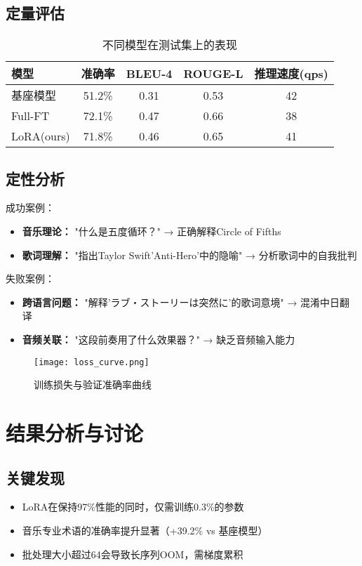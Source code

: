 \documentclass[a4paper,11pt]{article}
\begin{document}
\subsection{定量评估}
\begin{table}[h]
    \centering
    \caption{不同模型在测试集上的表现}
    \begin{tabular}{lcccc}
        \toprule
        模型 & 准确率 & BLEU-4 & ROUGE-L & 推理速度(qps) \\
        \midrule
        基座模型 & 51.2\% & 0.31 & 0.53 & 42 \\
        Full-FT & 72.1\% & 0.47 & 0.66 & 38 \\
        LoRA(ours) & 71.8\% & 0.46 & 0.65 & 41 \\
        \bottomrule
    \end{tabular}
\end{table}

\subsection{定性分析}
成功案例：
\begin{itemize}
    \item \textbf{音乐理论：} "什么是五度循环？" → 正确解释Circle of Fifths
    \item \textbf{歌词理解：} "指出Taylor Swift'Anti-Hero'中的隐喻" → 分析歌词中的自我批判
\end{itemize}

失败案例：
\begin{itemize}
    \item \textbf{跨语言问题：} "解释'ラブ・ストーリーは突然に'的歌词意境" → 混淆中日翻译
    \item \textbf{音频关联：} "这段前奏用了什么效果器？" → 缺乏音频输入能力
\end{itemize}

\begin{figure}[h]
    \centering
    \texttt{[image: loss\_curve.png]}
    \caption{训练损失与验证准确率曲线}
    \label{fig:training}
\end{figure}

\section{结果分析与讨论}
\subsection{关键发现}
\begin{itemize}
    \item LoRA在保持97\%性能的同时，仅需训练0.3\%的参数
    \item 音乐专业术语的准确率提升显著（+39.2\% vs 基座模型）
    \item 批处理大小超过64会导致长序列OOM，需梯度累积
\end{itemize}
\end{document}
